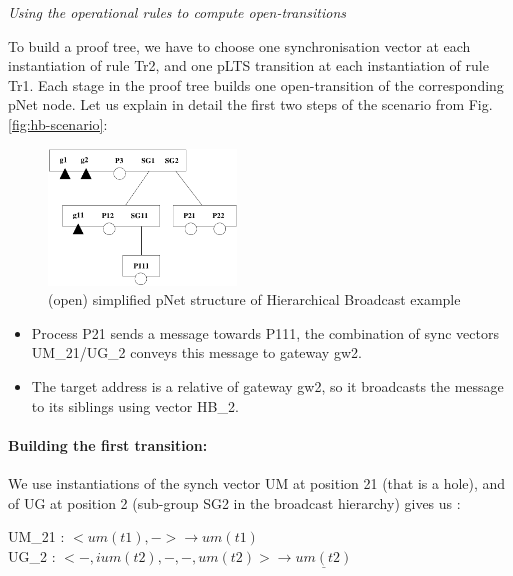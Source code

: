 \documentclass{lncs/llncs}
\newcommand{\TODO}[1]{\textcolor{red}{\textbf{[TODO:#1]}}}
\begin{document}
\begin{example} \emph{Using the operational rules to compute
    open-transitions}
  \label{example:deduction-trees}

To build a proof tree, we have to choose one synchronisation vector at
each instantiation of rule Tr2, and one pLTS transition at each
instantiation of rule Tr1. Each stage in the proof tree builds one
open-transition of the corresponding pNet node.  Let us explain in
detail the first two steps of the
scenario from Fig. \ref{fig:hb-scenario}:

\begin{figure}[h]
\centerline{ \includegraphics[width=5cm]{XFIG/HB2} }
\caption{(open) simplified pNet structure of Hierarchical Broadcast example}
\label{fig:flattening}
\end{figure}

\begin{itemize}
\item Process P21 sends a message towards P111, the combination of sync vectors UM\_21/UG\_2 conveys this message to gateway gw2.
\item The target address is a relative of gateway gw2, so it
  broadcasts the message to its siblings using vector HB\_2.
\end{itemize}
\end{example}


\paragraph{Building the first transition:}

We use instantiations of the synch vector UM at position 21 (that is a
hole), and of UG at position 2 (sub-group SG2 in the broadcast hierarchy) gives us :
\medskip


\noindent
UM\_21 : $< um(t1), - > \to\!um(t1)$\\
UG\_2 : $< -, ium(t2), -, -, um(t2) > \longrightarrow \underline{um(t2)}$
\end{document}
